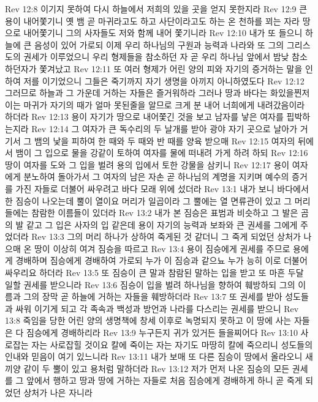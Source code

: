 Rev 12:8  이기지 못하여 다시 하늘에서 저희의 있을 곳을 얻지 못한지라
Rev 12:9  큰 용이 내어쫓기니 옛 뱀 곧 마귀라고도 하고 사단이라고도 하는 온 천하를 꾀는 자라 땅으로 내어쫓기니 그의 사자들도 저와 함께 내어 쫓기니라
Rev 12:10  내가 또 들으니 하늘에 큰 음성이 있어 가로되 이제 우리 하나님의 구원과 능력과 나라와 또 그의 그리스도의 권세가 이루었으니 우리 형제들을 참소하던 자 곧 우리 하나님 앞에서 밤낮 참소하던자가 쫓겨났고
Rev 12:11  또 여러 형제가 어린 양의 피와 자기의 증거하는 말을 인하여 저를 이기었으니 그들은 죽기까지 자기 생명을 아끼지 아니하였도다
Rev 12:12  그러므로 하늘과 그 가운데 거하는 자들은 즐거워하라 그러나 땅과 바다는 화있을찐저 이는 마귀가 자기의 때가 얼마 못된줄을 알므로 크게 분 내어 너희에게 내려갔음이라 하더라
Rev 12:13  용이 자기가 땅으로 내어쫓긴 것을 보고 남자를 낳은 여자를 핍박하는지라
Rev 12:14  그 여자가 큰 독수리의 두 날개를 받아 광야 자기 곳으로 날아가 거기서 그 뱀의 낯을 피하여 한 때와 두 때와 반 때를 양육 받으매
Rev 12:15  여자의 뒤에서 뱀이 그 입으로 물을 강같이 토하여 여자를 물에 떠내려 가게 하려 하되
Rev 12:16  땅이 여자를 도와 그 입을 벌려 용의 입에서 토한 강물을 삼키니
Rev 12:17  용이 여자에게 분노하여 돌아가서 그 여자의 남은 자손 곧 하나님의 계명을 지키며 예수의 증거를 가진 자들로 더불어 싸우려고 바다 모래 위에 섰더라
Rev 13:1  내가 보니 바다에서 한 짐승이 나오는데 뿔이 열이요 머리가 일곱이라 그 뿔에는 열 면류관이 있고 그 머리들에는 참람한 이름들이 있더라
Rev 13:2  내가 본 짐승은 표범과 비슷하고 그 발은 곰의 발 같고 그 입은 사자의 입 같은데 용이 자기의 능력과 보좌와 큰 권세를 그에게 주었더라
Rev 13:3  그의 머리 하나가 상하여 죽게된 것 같더니 그 죽게 되었던 상처가 나으매 온 땅이 이상히 여겨 짐승을 따르고
Rev 13:4  용이 짐승에게 권세를 주므로 용에게 경배하며 짐승에게 경배하여 가로되 누가 이 짐승과 같으뇨 누가 능히 이로 더불어 싸우리요 하더라
Rev 13:5  또 짐승이 큰 말과 참람된 말하는 입을 받고 또 마흔 두달 일할 권세를 받으니라
Rev 13:6  짐승이 입을 벌려 하나님을 향하여 훼방하되 그의 이름과 그의 장막 곧 하늘에 거하는 자들을 훼방하더라
Rev 13:7  또 권세를 받아 성도들과 싸워 이기게 되고 각 족속과 백성과 방언과 나라를 다스리는 권세를 받으니
Rev 13:8  죽임을 당한 어린 양의 생명책에 창세 이후로 녹명되지 못하고 이 땅에 사는 자들은 다 짐승에게 경배하리라
Rev 13:9  누구든지 귀가 있거든 들을찌어다
Rev 13:10  사로잡는 자는 사로잡힐 것이요 칼에 죽이는 자는 자기도 마땅히 칼에 죽으리니 성도들의 인내와 믿음이 여기 있느니라
Rev 13:11  내가 보매 또 다른 짐승이 땅에서 올라오니 새끼양 같이 두 뿔이 있고 용처럼 말하더라
Rev 13:12  저가 먼저 나온 짐승의 모든 권세를 그 앞에서 행하고 땅과 땅에 거하는 자들로 처음 짐승에게 경배하게 하니 곧 죽게 되었던 상처가 나은 자니라
